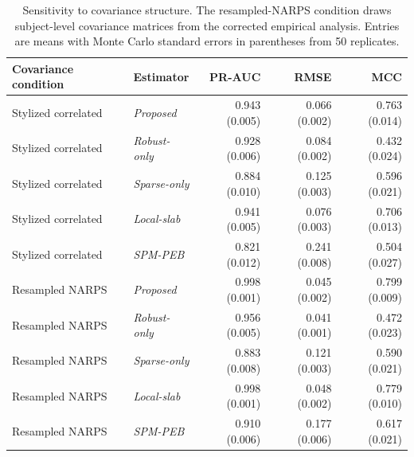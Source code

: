 \begin{table}[htbp]
\centering
\small
\setlength{\tabcolsep}{4pt}
\caption{Numerical diagnostics across the 1000 fits per estimator in the principal grid. PIP diagnostics apply only to estimators using posterior sampling.}
\label{tab:supp-diagnostics}
\end{table}
 
\begin{table}[htbp]
\centering
\small
\setlength{\tabcolsep}{4pt}
\caption{Sensitivity to covariance structure. The resampled-NARPS condition draws subject-level covariance matrices from the corrected empirical analysis. Entries are means with Monte Carlo standard errors in parentheses from 50 replicates.}
\label{tab:supp-empirical-covariance}
\begin{tabular}{llrrr}
\toprule
Covariance condition & Estimator & PR-AUC & RMSE & MCC\\
\midrule 
Stylized correlated & \emph{Proposed} & 0.943 (0.005) & 0.066 (0.002) & 0.763 (0.014)\\ 
Stylized correlated & \emph{Robust-only} & 0.928 (0.006) & 0.084 (0.002) & 0.432 (0.024)\\ 
Stylized correlated & \emph{Sparse-only} & 0.884 (0.010) & 0.125 (0.003) & 0.596 (0.021)\\ 
Stylized correlated & \emph{Local-slab} & 0.941 (0.005) & 0.076 (0.003) & 0.706 (0.013)\\ 
Stylized correlated & \emph{SPM-PEB} & 0.821 (0.012) & 0.241 (0.008) & 0.504 (0.027)\\ 
Resampled NARPS & \emph{Proposed} & 0.998 (0.001) & 0.045 (0.002) & 0.799 (0.009)\\ 
Resampled NARPS & \emph{Robust-only} & 0.956 (0.005) & 0.041 (0.001) & 0.472 (0.023)\\ 
Resampled NARPS & \emph{Sparse-only} & 0.883 (0.008) & 0.121 (0.003) & 0.590 (0.021)\\ 
Resampled NARPS & \emph{Local-slab} & 0.998 (0.001) & 0.048 (0.002) & 0.779 (0.010)\\ 
Resampled NARPS & \emph{SPM-PEB} & 0.910 (0.006) & 0.177 (0.006) & 0.617 (0.021)\\ 
\bottomrule
\end{tabular}
\end{table}
 
